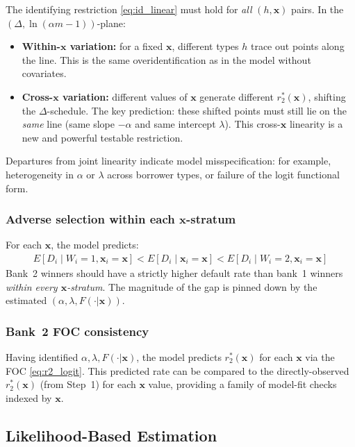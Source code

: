 \documentclass[12pt]{article}
\theoremstyle{plain}
\theoremstyle{plain}
\theoremstyle{definition}  %
\theoremstyle{remark}  %
\begin{document}
The identifying restriction \eqref{eq:id_linear} must hold for \emph{all} $(h, \mathbf{x})$ pairs. In the $(\Delta, \ln(\alpha m - 1))$-plane:
\begin{itemize}
    \item \textbf{Within-$\mathbf{x}$ variation:} for a fixed $\mathbf{x}$, different types $h$ trace out points along the line. This is the same overidentification as in the model without covariates.
    \item \textbf{Cross-$\mathbf{x}$ variation:} different values of $\mathbf{x}$ generate different $r_2^*(\mathbf{x})$, shifting the $\Delta$-schedule. The key prediction: these shifted points must still lie on the \emph{same} line (same slope $-\alpha$ and same intercept $\lambda$). This cross-$\mathbf{x}$ linearity is a new and powerful testable restriction.
\end{itemize}
Departures from joint linearity indicate model misspecification: for example, heterogeneity in $\alpha$ or $\lambda$ across borrower types, or failure of the logit functional form.

\subsubsection{Adverse selection within each $\mathbf{x}$-stratum}

For each $\mathbf{x}$, the model predicts:
\begin{align*}
    E[D_i \mid W_i = 1, \mathbf{x}_i = \mathbf{x}] < E[D_i \mid \mathbf{x}_i = \mathbf{x}] < E[D_i \mid W_i = 2, \mathbf{x}_i = \mathbf{x}]
\end{align*}
Bank~2 winners should have a strictly higher default rate than bank~1 winners \emph{within every $\mathbf{x}$-stratum}. The magnitude of the gap is pinned down by the estimated $(\alpha, \lambda, F(\cdot|\mathbf{x}))$.

\subsubsection{Bank~2 FOC consistency}

Having identified $\alpha, \lambda, F(\cdot|\mathbf{x})$, the model predicts $r_2^*(\mathbf{x})$ for each $\mathbf{x}$ via the FOC \eqref{eq:r2_logit}. This predicted rate can be compared to the directly-observed $r_2^*(\mathbf{x})$ (from Step~1) for each $\mathbf{x}$ value, providing a family of model-fit checks indexed by $\mathbf{x}$.


\subsection{Likelihood-Based Estimation}\label{sec:estimation}
\end{document}
